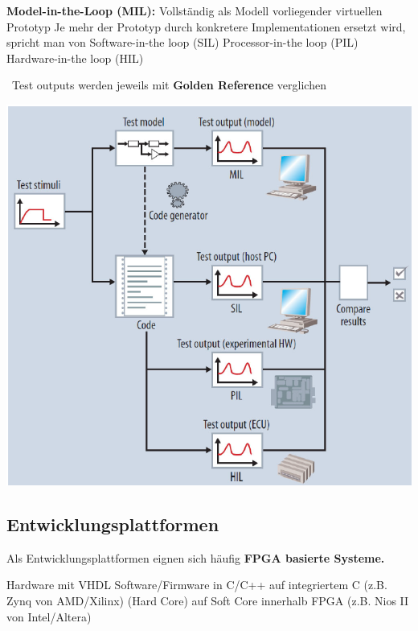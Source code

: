 \begin{outline}
    \1 \textbf{Model-in-the-Loop (MIL):} Vollständig als Modell vorliegender virtuellen Prototyp
    \1 Je mehr der Prototyp durch konkretere Implementationen ersetzt wird, spricht man von
        \2 Software-in-the loop (SIL)
        \2 Processor-in-the loop (PIL)
        \2 Hardware-in-the loop (HIL)
\end{outline}

\vspace{0.2cm}

\textrightarrow\ Test outputs werden jeweils mit \textbf{Golden Reference} verglichen
\begin{center}
    \includegraphics[width=0.9\columnwidth]{images/x_in_loop_testing.png}
\end{center}


\subsection{Entwicklungsplattformen}

Als Entwicklungsplattformen eignen sich häufig \textbf{FPGA basierte Systeme.}

\begin{outline}
    \1 Hardware mit VHDL
    \1 Software/Firmware in C/C++
        \2 auf integriertem \textmu C (z.B. Zynq von AMD/Xilinx) (Hard Core)
        \2 auf Soft Core innerhalb FPGA (z.B. Nios II von Intel/Altera)
\end{outline}

